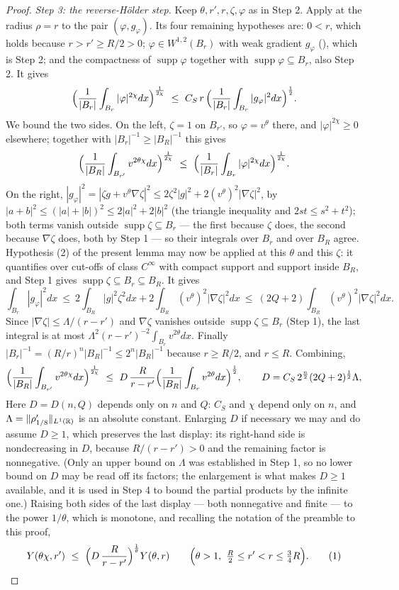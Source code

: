 \begin{proof}
\emph{Step 3: the reverse-H\"older step.}  Keep $\theta,r',r,\zeta,\varphi$ as in
Step 2.  Apply  at the radius $\rho=r$ to the
pair $(\varphi,g_\varphi)$.  Its four remaining hypotheses are: $0<r$, which
holds because $r>r'\ge R/2>0$; $\varphi\in W^{1,2}(B_r)$ with weak gradient
$g_\varphi$ (), which is Step 2; and the compactness of
$\operatorname{supp}\varphi$ together with
$\operatorname{supp}\varphi\subseteq B_r$, also Step 2.  It gives
\[
\Bigl(\frac1{|B_r|}\int_{B_r}|\varphi|^{2\chi}dx\Bigr)^{\frac1{2\chi}}
\ \le\ C_S\,r\,\Bigl(\frac1{|B_r|}\int_{B_r}|g_\varphi|^2dx\Bigr)^{\frac12}.
\]
We bound the two sides.  On the left, $\zeta=1$ on $B_{r'}$, so $\varphi=v^\theta$
there, and $|\varphi|^{2\chi}\ge0$ elsewhere; together with
$|B_r|^{-1}\ge|B_R|^{-1}$ this gives
\[
\Bigl(\frac1{|B_R|}\int_{B_{r'}}v^{2\theta\chi}dx\Bigr)^{\frac1{2\chi}}
\ \le\
\Bigl(\frac1{|B_r|}\int_{B_r}|\varphi|^{2\chi}dx\Bigr)^{\frac1{2\chi}} .
\]
On the right, $|g_\varphi|^2=|\zeta g+v^\theta\nabla\zeta|^2
\le2\zeta^2|g|^2+2(v^\theta)^2|\nabla\zeta|^2$, by
$|a+b|^2\le(|a|+|b|)^2\le2|a|^2+2|b|^2$ (the triangle inequality and
$2st\le s^2+t^2$); both terms vanish outside
$\operatorname{supp}\zeta\subseteq B_r$ --- the first because $\zeta$ does, the
second because $\nabla\zeta$ does, both by Step 1 --- so their integrals over
$B_r$ and over $B_R$ agree.  Hypothesis (2) of the present lemma may now be
applied at this $\theta$ and this $\zeta$: it quantifies over cut-offs of class
$C^\infty$ with compact support and support inside $B_R$, and
Step 1 gives $\operatorname{supp}\zeta\subseteq B_r\subseteq B_R$.  It gives
\[
\int_{B_r}|g_\varphi|^2dx
\ \le\ 2\int_{B_R}|g|^2\zeta^2dx+2\int_{B_R}(v^\theta)^2|\nabla\zeta|^2dx
\ \le\ (2Q+2)\int_{B_R}(v^\theta)^2|\nabla\zeta|^2dx .
\]
Since $|\nabla\zeta|\le\Lambda/(r-r')$ and $\nabla\zeta$ vanishes outside
$\operatorname{supp}\zeta\subseteq B_r$ (Step 1),
the last integral is at most $\Lambda^2(r-r')^{-2}\int_{B_r}v^{2\theta}dx$.
Finally $|B_r|^{-1}=(R/r)^n|B_R|^{-1}\le2^n|B_R|^{-1}$ because $r\ge R/2$, and
$r\le R$.  Combining,
\[
\Bigl(\frac1{|B_R|}\int_{B_{r'}}v^{2\theta\chi}dx\Bigr)^{\frac1{2\chi}}
\ \le\ D\,\frac R{r-r'}
\Bigl(\frac1{|B_R|}\int_{B_r}v^{2\theta}dx\Bigr)^{\frac12},
\qquad
D=C_S\,2^{\frac n2}(2Q+2)^{\frac12}\Lambda ,
\]
Here $D=D(n,Q)$ depends only on $n$ and $Q$: $C_S$ and $\chi$ depend only on
$n$, and $\Lambda=\|\rho_{1/8}'\|_{L^1(\mathbb{R})}$ is an absolute constant.  Enlarging
$D$ if necessary we may and do assume $D\ge1$, which preserves the last display:
its right-hand side is nondecreasing in $D$, because $R/(r-r')>0$ and the
remaining factor is nonnegative.  (Only an upper bound on $\Lambda$ was
established in Step 1, so no lower bound on $D$ may be read off its factors; the
enlargement is what makes $D\ge1$ available, and it is used in Step 4 to bound
the partial products by the infinite one.)
Raising both sides of the last display --- both nonnegative and finite --- to the
power $1/\theta$, which is monotone, and recalling the notation of the preamble
to this proof,
\[
Y(\theta\chi,r')\ \le\ \Bigl(D\,\frac R{r-r'}\Bigr)^{\frac1\theta}Y(\theta,r)
\qquad\Bigl(\theta>1,\ \tfrac R2\le r'<r\le\tfrac34R\Bigr).
\tag{1}
\]


\end{proof}
